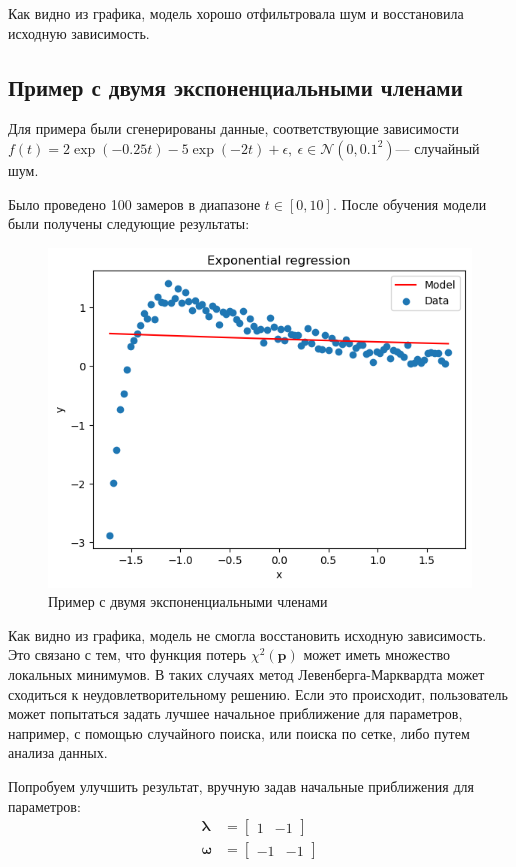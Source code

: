 Как видно из графика, модель хорошо отфильтровала шум и восстановила исходную зависимость.

\subsection{Пример с двумя экспоненциальными членами}

Для примера были сгенерированы данные, соответствующие зависимости $f(t) = 2\exp(-0.25t)-5\exp(-2t)  + \epsilon,\:\epsilon\in\mathcal{N}(0, 0.1^2)$— случайный шум.

Было проведено 100 замеров в диапазоне $t\in[0, 10]$. После обучения модели были получены следующие результаты:

\begin{figure}[h!]
	\centering
	\includegraphics[width=0.7\linewidth]{../img/ex2_poor.png}
	\caption{Пример с двумя экспоненциальными членами}
	\label{fig:image}
\end{figure}

Как видно из графика, модель не смогла восстановить исходную зависимость. Это связано с тем, что функция потерь $\chi^2(\mathbf{p})$ может иметь множество локальных минимумов. В таких случаях метод Левенберга-Марквардта может сходиться к неудовлетворительному решению. Если это происходит, пользователь может попытаться задать лучшее начальное приближение для параметров, например, с помощью случайного поиска, или поиска по сетке, либо путем анализа данных.

Попробуем улучшить результат, вручную задав начальные приближения для параметров:
$$
	\begin{aligned}
		\boldsymbol{\lambda} & = \begin{bmatrix} 1 & -1 \end{bmatrix}  \\
		\boldsymbol{\omega}  & = \begin{bmatrix} -1 & -1 \end{bmatrix}
	\end{aligned}
$$

